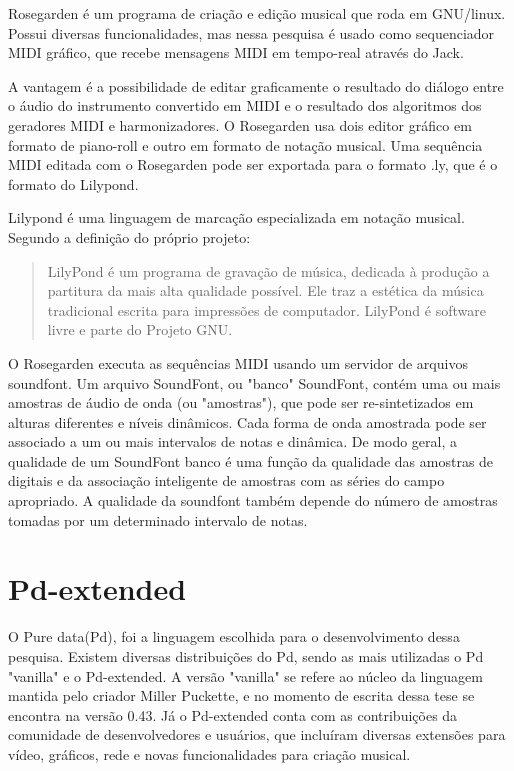 \documentclass[draft]{ppgmus}
\begin{document}
Rosegarden é um programa de criação e edição musical que roda em GNU/linux.
Possui diversas funcionalidades, mas nessa pesquisa é usado como sequenciador
MIDI gráfico, que recebe mensagens MIDI em tempo-real através do Jack.

A vantagem é a possibilidade de editar graficamente o resultado do diálogo entre
o áudio do instrumento convertido em MIDI e o resultado dos algoritmos dos geradores
MIDI e harmonizadores. O Rosegarden usa dois editor gráfico em formato de piano-roll
e outro em formato de notação musical. Uma sequência MIDI editada com o Rosegarden
pode ser exportada para o formato .ly, que é o formato do Lilypond.

Lilypond é uma linguagem de marcação especializada em notação musical. Segundo
a definição do próprio projeto:

\begin{quote}
 LilyPond é um programa de gravação de música, dedicada à produção a partitura da mais alta qualidade possível. 
Ele traz a estética da música tradicional escrita para impressões de computador. LilyPond é software livre e 
parte do Projeto GNU.
\end{quote} 

O Rosegarden executa as sequências MIDI usando um servidor de arquivos soundfont.
Um arquivo SoundFont, ou "banco" SoundFont, contém uma ou mais amostras de áudio de onda (ou "amostras"),
que pode ser re-sintetizados em alturas diferentes e níveis dinâmicos. Cada forma de onda amostrada pode ser
associado a um ou mais intervalos de notas e dinâmica. De modo geral, a qualidade de um
SoundFont banco é uma função da qualidade das amostras de digitais e da associação inteligente
de amostras com as séries do campo apropriado. A qualidade da soundfont também depende do número de amostras
tomadas por um determinado intervalo de notas. 



\section{Pd-extended}

O Pure data(Pd), foi a linguagem escolhida para o desenvolvimento dessa pesquisa.
Existem diversas distribuições do Pd, sendo as mais utilizadas o Pd "vanilla" e o Pd-extended.
A versão "vanilla" se refere ao núcleo da linguagem mantida pelo criador Miller Puckette, e no
momento de escrita dessa tese se encontra na versão 0.43. Já o Pd-extended conta com as contribuições
da comunidade de desenvolvedores e usuários, que incluíram diversas extensões para vídeo, gráficos, rede e
novas funcionalidades para criação musical.
\end{document}

